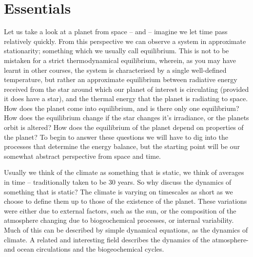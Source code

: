 \documentclass[12pt]{book}
\title{\DocTitle}
\author{Thorsten Mauritsen}
\date{\today}
\begin{document}
 
\maketitle
\tableofcontents



\mainmatter
\chapter{Essentials}
\label{chapter:essentials}
Let us take a look at a planet from space -- and -- imagine we let time pass relatively quickly. From this perspective we can observe a system in approximate stationarity; something which we usually call equilibrium. This is not to be mistaken for a strict thermodynamical equilibrium, wherein, as you may have learnt in other courses, the system is characterised by a single well-defined temperature, but rather an approximate equilibrium between radiative energy received from the star around which our planet of interest is circulating (provided it does have a star), and the thermal energy that the planet is radiating to space. How does the planet come into equilibrium, and is there only one equilibrium? How does the equilibrium change if the star changes it's irradiance, or the planets orbit is altered? How does the equilibrium of the planet depend on properties of the planet? To begin to answer these questions we will have to dig into the processes that determine the energy balance, but the starting point will be our somewhat abstract perspective from space and time.

Usually we think of the climate as something that is static, we think of averages in time -- traditionally taken to be 30 years. So why discuss the dynamics of something that is static? The climate is varying on timescales as short as we choose to define them up to those of the existence of the planet. These variations were either due to external factors, such as the sun, or  the composition of the atmosphere changing due to biogeochemical processes, or internal variability. Much of this can be described by simple dynamical equations, as the dynamics of climate. A related and interesting field describes the dynamics of the atmosphere- and ocean circulations and the biogeochemical cycles. 
\end{document}
